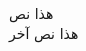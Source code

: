 \documentclass[preview]{standalone}
\begin{document}
\begin{center}
\raggedleft هذا نص\\ هذا نص آخر
\end{center}
\end{document}
